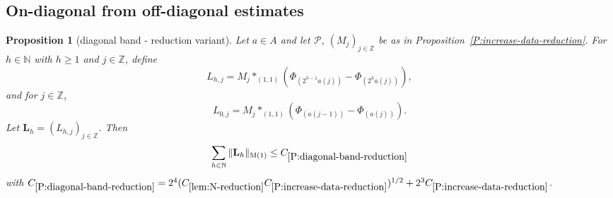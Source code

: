 \documentclass[12pt,reqno]{amsart}
\theoremstyle{plain}
\newtheorem{proposition}[theorem]{Proposition}
\numberwithin{equation}{section}
\theoremstyle{remark}
\newcommand{\uses}[1]{}
\newcommand{\usesdefs}[1]{}
\newcommand{\Z}{{\mathbb Z}}
\newcommand{\N}{{\mathbb N}}
\begin{document}
\subsection{On-diagonal from off-diagonal estimates}\label{sec:on-diag}
\begin{proposition}[diagonal band - reduction variant]
\label{P:diagonal-band-reduction}\uses{P:increase-data-reduction,convolution vector,Cauchy-Schwarz at k,lem:N-reduction,Cauchy-Schwarz at n-1}\usesdefs{auto:Wiener-space-definition,auto:convolution-along-vector-definition,normalized function tuples,auto:prism-form-definition,multiplicatively spaced monotone sequences,standard bump,kernel sequences,square root Gaussian difference}
Let $a\in A$ and let $\mathcal P$, $(M_j)_{j\in \Z}$ be as in Proposition~\ref{P:increase-data-reduction}. For $h\in\N$ with $h\ge1$ and $j\in\Z$, define
\begin{equation}\label{auto:diagonal-band-positive-scale}
L_{h,j}= M_j \ast_{(1,1)} (\Phi_{(2^{h-1}a(j))}-\Phi_{(2^{h}a(j))}),
\end{equation}
and for $j\in \Z$,
\begin{equation}\label{auto:diagonal-band-zero-scale}
L_{0,j}=M_j \ast_{(1,1)} (\Phi_{(a(j-1))}-\Phi_{(a(j))}).
\end{equation}
Let $\mathbf{L}_h=(L_{h,j})_{j\in \Z}$. Then
\begin{equation}\label{auto:diagonal-band-sum-bound}
\sum_{h\in \N} \|\mathbf{L}_h\|_{\rm M(1)} \leq C_{\ref{P:diagonal-band-reduction}}
\end{equation}
with  $C_{\ref{P:diagonal-band-reduction}} = 2^4(
    C_{\ref{lem:N-reduction}}
    C_{\ref{P:increase-data-reduction}}
  )^{1/2} + 2^3 C_{\ref{P:increase-data-reduction}}$.
\end{proposition}
\end{document}
